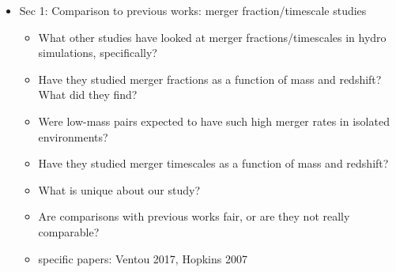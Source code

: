 \documentclass[twocolumn,linenumbers]{aastex631}
\begin{document}
    \begin{itemize}
        \item Sec 1: Comparison to previous works: merger fraction/timescale studies
        \begin{itemize} 
            \item What other studies have looked at merger fractions/timescales in hydro simulations, specifically? 
            \item Have they studied merger fractions as a function of mass and redshift? What did they find?
            \item Were low-mass pairs expected to have such high merger rates in isolated environments? 
            \item Have they studied merger timescales as a function of mass and redshift? 
            \item What is unique about our study?
            \item Are comparisons with previous works fair, or are they not really comparable?
            \item specific papers: Ventou 2017, Hopkins 2007
        \end{itemize}


\end{itemize}
\end{document}
